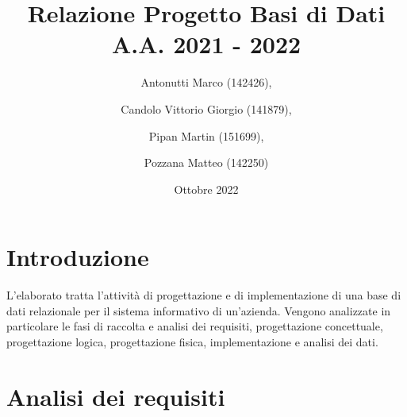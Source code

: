 \documentclass{article}
\title{Relazione Progetto Basi di Dati \\ A.A. 2021 - 2022}
\author{Antonutti Marco (142426),
        \and Candolo Vittorio Giorgio (141879),
        \and Pipan Martin (151699),
        \and Pozzana Matteo (142250)}
\date{Ottobre 2022}
\begin{document}
\maketitle

\newpage
\renewcommand{\contentsname}{Indice}
\tableofcontents

\newpage

\section{Introduzione}
L'elaborato tratta l'attività di progettazione e di implementazione di una base di dati relazionale per il sistema informativo di un'azienda.
\newline
\newline
Vengono analizzate in particolare le fasi di raccolta e analisi dei requisiti, progettazione concettuale, progettazione logica, progettazione fisica, implementazione e analisi dei dati.

\newpage

\section{Analisi dei requisiti}
\end{document}
